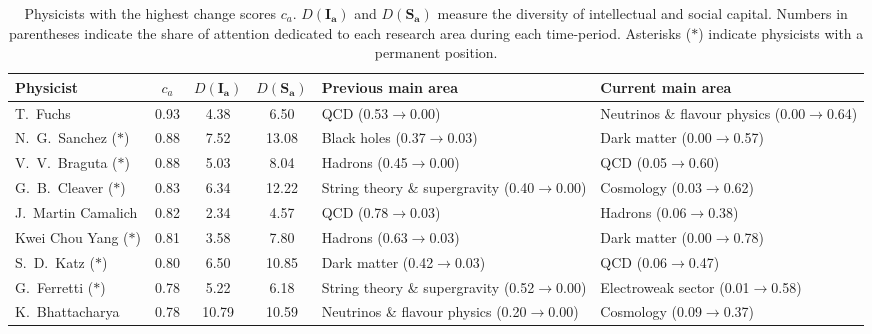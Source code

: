 \begin{table}[H]
\centering
\caption{Physicists with the highest change scores $c_a$. $D(\bm{I_a})$ and $D(\bm{S_a})$ measure the diversity of intellectual and social capital. Numbers in parentheses indicate the share of attention dedicated to each research area during each time-period. Asterisks ($\ast$) indicate physicists with a permanent position.}
\label{table:top_change}
\renewcommand{\arraystretch}{2}\fontsize{6}{7}\selectfont
\begin{tabular}{p{}|c|c|c|b{}|b{}}
\toprule
               Physicist & $c_a$ & $D(\bm{I_a})$ & $D(\bm{S_a})$ &                            Previous main area &                               Current main area \\
\midrule
                T.~Fuchs &  0.93 &          4.38 &          6.50 &                           QCD (0.53$\to$0.00) & Neutrinos \& flavour physics (0.00$\to$0.64)\\ \hline
  N.~G.~Sanchez ($\ast$) &  0.88 &          7.52 &         13.08 &                   Black holes (0.37$\to$0.03) &                  Dark matter (0.00$\to$0.57)\\ \hline
  V.~V.~Braguta ($\ast$) &  0.88 &          5.03 &          8.04 &                       Hadrons (0.45$\to$0.00) &                          QCD (0.05$\to$0.60)\\ \hline
  G.~B.~Cleaver ($\ast$) &  0.83 &          6.34 &         12.22 & String theory \& supergravity (0.40$\to$0.00) &                    Cosmology (0.03$\to$0.62)\\ \hline
      J.~Martin Camalich &  0.82 &          2.34 &          4.57 &                           QCD (0.78$\to$0.03) &                      Hadrons (0.06$\to$0.38)\\ \hline
 Kwei Chou Yang ($\ast$) &  0.81 &          3.58 &          7.80 &                       Hadrons (0.63$\to$0.03) &                  Dark matter (0.00$\to$0.78)\\ \hline
     S.~D.~Katz ($\ast$) &  0.80 &          6.50 &         10.85 &                   Dark matter (0.42$\to$0.03) &                          QCD (0.06$\to$0.47)\\ \hline
    G.~Ferretti ($\ast$) &  0.78 &          5.22 &          6.18 & String theory \& supergravity (0.52$\to$0.00) &           Electroweak sector (0.01$\to$0.58)\\ \hline
         K.~Bhattacharya &  0.78 &         10.79 &         10.59 &  Neutrinos \& flavour physics (0.20$\to$0.00) &                    Cosmology (0.09$\to$0.37)\\ \hline

\end{tabular}
\end{table}
